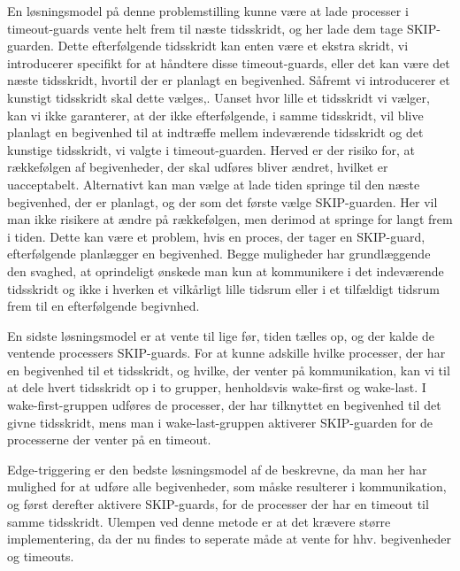 En løsningsmodel på denne problemstilling kunne være at lade processer i timeout-guards vente helt frem til næste tidsskridt, og her lade dem tage SKIP-guarden. Dette efterfølgende tidsskridt kan enten være et ekstra skridt, vi introducerer specifikt for at håndtere disse timeout-guards, eller det kan være det næste tidsskridt, hvortil der er planlagt en begivenhed. 
Såfremt vi introducerer et kunstigt tidsskridt skal dette vælges,. Uanset hvor lille et tidsskridt vi vælger, kan vi ikke garanterer, at der ikke efterfølgende, i samme tidsskridt, vil blive planlagt en begivenhed til at indtræffe mellem indeværende tidsskridt og det kunstige tidsskridt, vi valgte i timeout-guarden. Herved er der risiko for, at rækkefølgen af begivenheder, der skal udføres bliver ændret, hvilket er uacceptabelt. 
Alternativt kan man vælge at lade tiden springe til den næste begivenhed, der er planlagt, og der som det første vælge SKIP-guarden. Her vil man ikke risikere at ændre på rækkefølgen, men derimod at springe for langt frem i tiden. Dette kan være et problem, hvis en proces, der tager en SKIP-guard, efterfølgende planlægger en begivenhed.
Begge muligheder har grundlæggende den svaghed, at oprindeligt ønskede man kun at kommunikere i det indeværende tidsskridt og ikke i hverken et vilkårligt lille tidsrum eller i et tilfældigt tidsrum frem til en efterfølgende begivnhed.

En sidste løsningsmodel er at vente til lige før, tiden tælles op, og der kalde de ventende processers SKIP-guards. 
For at kunne adskille hvilke processer, der har en begivenhed til et tidsskridt, og hvilke, der venter på kommunikation, kan vi  til at dele hvert tidsskridt op i to grupper, henholdsvis wake-first og wake-last.
I wake-first-gruppen udføres de processer, der har tilknyttet en begivenhed til det givne tidsskridt, mens man i  wake-last-gruppen aktiverer SKIP-guarden for de processerne der venter på en timeout.

Edge-triggering er den bedste løsningsmodel af de beskrevne, da man her har mulighed for at udføre alle begivenheder, som måske resulterer i kommunikation, og først derefter aktivere SKIP-guards, for de processer der har en timeout til samme tidsskridt. Ulempen ved denne metode er at det krævere større implementering, da der nu findes to seperate måde at vente for hhv. begivenheder og timeouts.

